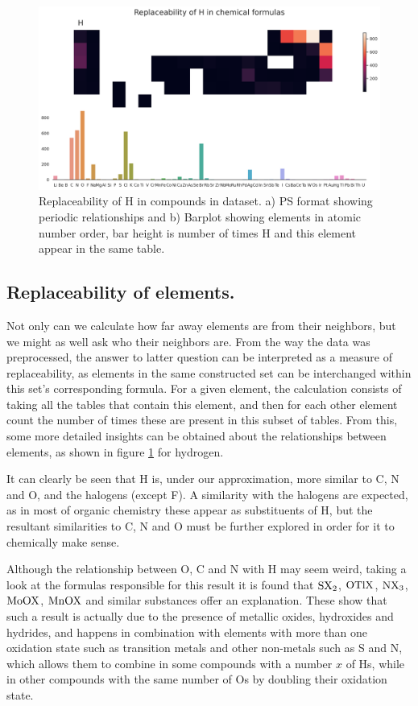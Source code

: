 \documentclass[]{article}
\begin{document}
\begin{figure}[h!]
  \centering
	\includegraphics[width=13.0cm]{replace_H.png}
	\caption{Replaceability of H in compounds in dataset. a) PS format showing periodic relationships and b) Barplot showing elements in atomic number order, bar height is number of times H and this element appear in the same table.}
	\label{fig:fig3}
\end{figure}

\subsection{Replaceability of elements.}

Not only can we calculate how far away elements are from their neighbors, but we might as well ask who their neighbors are. From the way the data was preprocessed, the answer to latter question can be interpreted as a measure of replaceability, as elements in the same constructed set can be interchanged within this set's corresponding formula. For a given element, the calculation consists of taking all the tables that contain this element, and then for each other element count the number of times these are present in this subset of tables. From this, some more detailed insights can be obtained about the relationships between elements, as shown in figure \ref{fig:fig3} for hydrogen.

It can clearly be seen that H is, under our approximation, more similar to C, N and O, and the halogens (except F). A similarity with the halogens are expected, as in most of organic chemistry these appear as substituents of H, but the resultant similarities to C, N and O must be further explored in order for it to chemically make sense.

Although the relationship between O, C and N with H may seem weird, taking a look at the formulas responsible for this result it is found that $\ce{SX2}$, $\ce{OTlX}$, $\ce{NX3}$, $\ce{MoOX}$, $\ce{MnOX}$ and similar substances offer an explanation. These show that such a result is actually due to the presence of metallic oxides, hydroxides and hydrides, and happens in combination with elements with more than one oxidation state such as transition metals and other non-metals such as S and N, which allows them to combine in some compounds with a number $\textit{x}$ of Hs, while in other compounds with the same number of Os by doubling their oxidation state.
\end{document}
